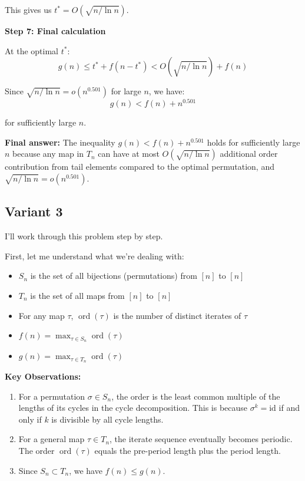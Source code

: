 \documentclass[12pt,a4paper]{article}
\theoremstyle{definition}
\begin{document}
    This gives us $t^* = O(\sqrt{n/\ln n})$.

    \textbf{Step 7: Final calculation}

    At the optimal $t^*$:
    $$g(n) \leq t^* + f(n - t^*) < O(\sqrt{n/\ln n}) + f(n)$$

    Since $\sqrt{n/\ln n} = o(n^{0.501})$ for large $n$, we have:
    $$g(n) < f(n) + n^{0.501}$$

    for sufficiently large $n$.

    \textbf{Final answer:} The inequality $g(n) < f(n) + n^{0.501}$ holds for sufficiently large $n$ because any map in $T_n$ can have at most $O(\sqrt{n/\ln n})$ additional order contribution from tail elements compared to the optimal permutation, and $\sqrt{n/\ln n} = o(n^{0.501})$.
\subsection{Variant 3}
    I'll work through this problem step by step.

    First, let me understand what we're dealing with:
    \begin{itemize}
        \item $S_n$ is the set of all bijections (permutations) from $[n]$ to $[n]$
        \item $T_n$ is the set of all maps from $[n]$ to $[n]$
        \item For any map $\tau$, $\operatorname{ord}(\tau)$ is the number of distinct iterates of $\tau$
        \item $f(n) = \max_{\tau \in S_n} \operatorname{ord}(\tau)$
        \item $g(n) = \max_{\tau \in T_n} \operatorname{ord}(\tau)$
    \end{itemize}

    \textbf{Key Observations:}

    \begin{enumerate}
        \item For a permutation $\sigma \in S_n$, the order is the least common multiple of the lengths of its cycles in the cycle decomposition. This is because $\sigma^k = \text{id}$ if and only if $k$ is divisible by all cycle lengths.

        \item For a general map $\tau \in T_n$, the iterate sequence eventually becomes periodic. The order $\operatorname{ord}(\tau)$ equals the pre-period length plus the period length.

        \item Since $S_n \subset T_n$, we have $f(n) \leq g(n)$.
    \end{enumerate}
\end{document}

